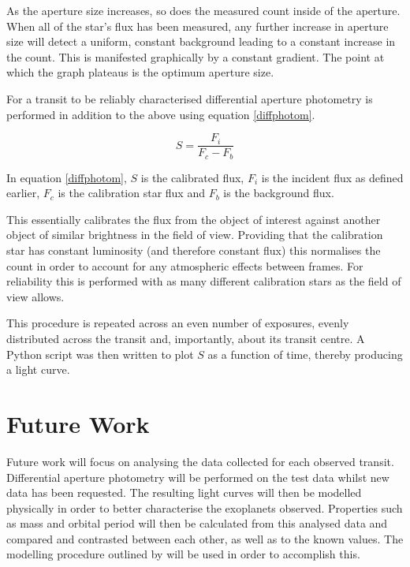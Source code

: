 \documentclass[twoside,4pt]{article}
\begin{document}
\begin{multicols}{2}
As the aperture size increases, so does the measured count inside of the aperture. When all of the star's flux has been measured, any further increase in aperture size will detect a uniform, constant background leading to a constant increase in the count. This is manifested graphically by a constant gradient. The point at which the graph plateaus is the optimum aperture size.

For a transit to be reliably characterised differential aperture photometry is performed in addition to the above using equation \ref{diffphotom}. 

\begin{equation} \label{diffphotom}
    S = \frac{F_{i}}{F_{c}-F_{b}}
\end{equation}

In equation \ref{diffphotom}, $S$ is the calibrated flux, $F_{i}$ is the incident flux as defined earlier, $F_{c}$ is the calibration star flux and $F_{b}$ is the background flux.

This essentially calibrates the flux from the object of interest against another object of similar brightness in the field of view. Providing that the calibration star has constant luminosity (and therefore constant flux) this normalises the count in order to account for any atmospheric effects between frames. For reliability this is performed with as many different calibration stars as the field of view allows.

This procedure is repeated across an even number of exposures, evenly distributed across the transit and, importantly, about its transit centre. A Python script was then written to plot $S$ as a function of time, thereby producing a light curve.


\section{Future Work}
Future work will focus on analysing the data collected for each observed transit. Differential aperture photometry will be performed on the test data whilst new data has been requested. The resulting light curves will then be modelled physically in order to better characterise the exoplanets observed. Properties such as mass and orbital period will then be calculated from this analysed data and compared and contrasted between each other, as well as to the known values. The modelling procedure outlined by \textcite{model} will be used in order to accomplish this.


\nocite{*}
\printbibliography

\end{multicols}
\end{document}
